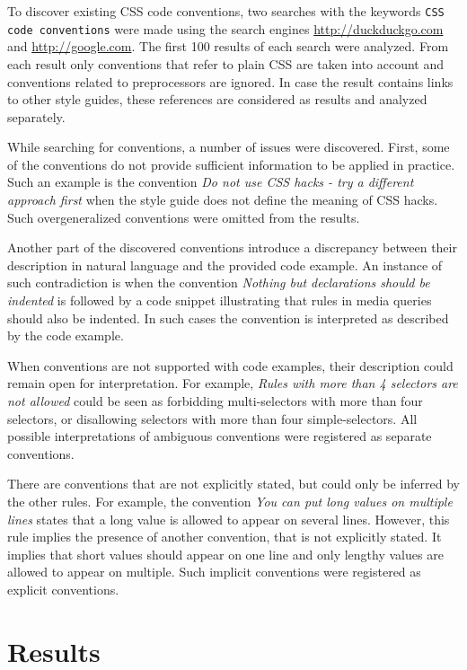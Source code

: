 \documentclass[parskip=full]{uvamscse}
\begin{document}
To discover existing CSS code conventions, two searches with the keywords \texttt{CSS code
conventions} were made using the search engines \url{http://duckduckgo.com} and
\url{http://google.com}. The first 100 results of each search were analyzed. From each result
only conventions that refer to plain CSS are taken into account and conventions related to
preprocessors are ignored. In case the result contains links to other style guides, these
references are considered as results and analyzed separately.

While searching for conventions, a number of issues were discovered. First, some of the
conventions do not provide sufficient information to be applied in practice. Such an example is the
convention \textit{Do not use CSS hacks - try a different approach first} when the style guide does
not define the meaning of CSS hacks. Such overgeneralized conventions were omitted from the results.

Another part of the discovered conventions introduce a discrepancy between their description in
natural language and the provided code example. An instance of such contradiction is when the
convention \textit{Nothing but declarations should be indented} is followed by a code snippet
illustrating that rules in media queries should also be indented. In such cases the convention is
interpreted as described by the code example.

When conventions are not supported with code examples, their description could remain open for
interpretation. For example, \textit{Rules with more than 4 selectors are not allowed} could be seen
as forbidding multi-selectors with more than four selectors, or disallowing selectors with more than
four simple-selectors. All possible interpretations of ambiguous conventions were registered as
separate conventions.

There are conventions that are not explicitly stated, but could only be inferred by the other rules.
For example, the convention \textit{You can put long values on multiple lines} states that a long
value is allowed to appear on several lines. However, this rule implies the presence of another
convention, that is not explicitly stated. It implies that short values should appear on one line
and only lengthy values are allowed to appear on multiple. Such implicit conventions were registered
as explicit conventions.

\section{Results}
\end{document}
